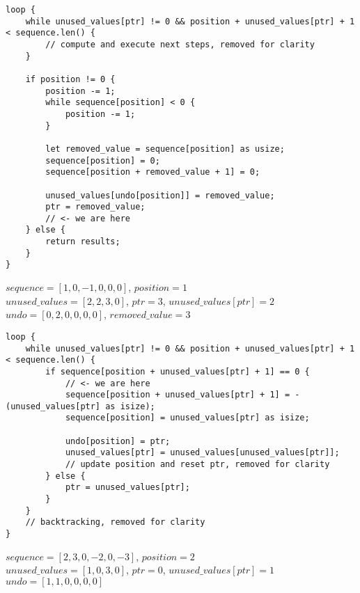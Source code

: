 \begin{frame}[fragile]
    \begin{verbatim}
loop {
    while unused_values[ptr] != 0 && position + unused_values[ptr] + 1 < sequence.len() {
        // compute and execute next steps, removed for clarity
    }
    
    if position != 0 {
        position -= 1;
        while sequence[position] < 0 {
            position -= 1;
        }
        
        let removed_value = sequence[position] as usize;
        sequence[position] = 0;
        sequence[position + removed_value + 1] = 0;
        
        unused_values[undo[position]] = removed_value;
        ptr = removed_value;
        // <- we are here
    } else {
        return results;
    }
}
    \end{verbatim}
    $sequence = [1, 0, -1, 0, 0, 0]$, $position = 1$\\
    $unused\_values = [2, 2, 3, 0]$, $ptr = 3$, $unused\_values[ptr] = 2$\\
    $undo = [0, 2, 0, 0, 0, 0]$, $removed\_value = 3$
\end{frame}
\begin{frame}[fragile]
    \begin{verbatim}
loop {
    while unused_values[ptr] != 0 && position + unused_values[ptr] + 1 < sequence.len() {
        if sequence[position + unused_values[ptr] + 1] == 0 {
            // <- we are here
            sequence[position + unused_values[ptr] + 1] = -(unused_values[ptr] as isize);
            sequence[position] = unused_values[ptr] as isize;

            undo[position] = ptr;
            unused_values[ptr] = unused_values[unused_values[ptr]];
            // update position and reset ptr, removed for clarity
        } else {
            ptr = unused_values[ptr];
        }
    }
    // backtracking, removed for clarity
}
    \end{verbatim}
    $sequence = [2, 3, 0, -2, 0, -3]$, $position = 2$\\
    $unused\_values = [1, 0, 3, 0]$, $ptr = 0$, $unused\_values[ptr] = 1$\\
    $undo = [1, 1, 0, 0, 0, 0]$
\end{frame}
